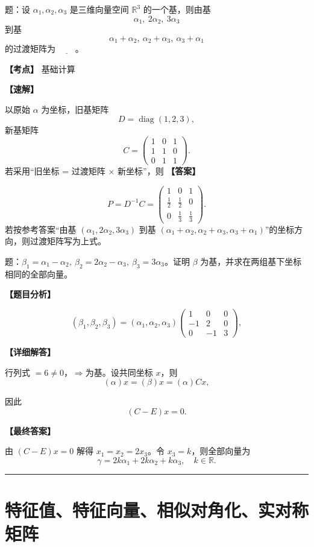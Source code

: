 ﻿\documentclass[11pt,a4paper,UTF8]{ctexart}
\begin{document}
\begin{answerbox}[2024--2025 填空 4]
题：设 $\alpha_1,\alpha_2,\alpha_3$ 是三维向量空间 $\mathbb R^3$ 的一个基，则由基
\[
\alpha_1,\ 2\alpha_2,\ 3\alpha_3
\]
到基
\[
\alpha_1+\alpha_2,\ \alpha_2+\alpha_3,\ \alpha_3+\alpha_1
\]
的过渡矩阵为 $\underline{\qquad}$。

\textbf{【考点】} 基础计算

\textbf{【速解】}

以原始 $\alpha$ 为坐标，旧基矩阵
\[D=\operatorname{diag}(1,2,3),\]
新基矩阵
\[C=\begin{pmatrix}1&0&1\\1&1&0\\0&1&1\end{pmatrix}.\]
若采用“旧坐标 = 过渡矩阵 × 新坐标”，则
\textbf{【答案】}

\[
P=D^{-1}C=
\begin{pmatrix}
1&0&1\\
\frac12&\frac12&0\\
0&\frac13&\frac13
\end{pmatrix}.
\]
若按参考答案“由基 \((\alpha_1,2\alpha_2,3\alpha_3)\) 到基 \((\alpha_1+\alpha_2,\alpha_2+\alpha_3,\alpha_3+\alpha_1)\)”的坐标方向，则过渡矩阵写为上式。
\end{answerbox}
\begin{answerbox}
题：$\beta_1=\alpha_1-\alpha_2,\ \beta_2=2\alpha_2-\alpha_3,\ \beta_3=3\alpha_3$。证明 $\beta$ 为基，并求在两组基下坐标相同的全部向量。

\textbf{【题目分析】}

\[
(\beta_1,\beta_2,\beta_3)=(\alpha_1,\alpha_2,\alpha_3)
\begin{pmatrix}
1&0&0\\
-1&2&0\\
0&-1&3
\end{pmatrix},
\]

\textbf{【详细解答】}

行列式 $=6\ne0$，$\Rightarrow$为基。设共同坐标 $x$，则
\[(\alpha)x=(\beta)x=(\alpha)Cx,\]

因此
\[(C-E)x=0.\]

\textbf{【最终答案】}

由 \((C-E)x=0\) 解得 \(x_1=x_2=2x_3\)。令 \(x_3=k\)，则全部向量为
\[
\gamma=2k\alpha_1+2k\alpha_2+k\alpha_3,\quad k\in\mathbb R.
\]
\end{answerbox}
\bigskip\hrule\bigskip

\section{特征值、特征向量、相似对角化、实对称矩阵}
\end{document}
